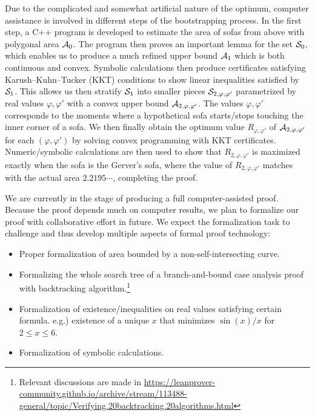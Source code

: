 Due to the complicated and somewhat artificial nature of the optimum, computer assistance is involved in different steps of the bootstrapping process. 
In the first step, a C++ program is developed to estimate the area of sofas from above with polygonal area $\mathcal{A}_0$.
The program then proves an important lemma for the set $\mathcal{S}_0$, which enables us to produce a much refined upper bound $\mathcal{A}_1$ which is both continuous and convex.
Symbolic calculations then produce certificates satisfying Karush–Kuhn–Tucker (KKT) conditions to show linear inequalities satisfied by $\mathcal{S}_1$. 
This allows us then stratify $\mathcal{S}_1$ into smaller pieces $\mathcal{S}_{2, \varphi, \varphi'}$ parametrized by real values $\varphi, \varphi'$ with a convex upper bound $\mathcal{A}_{2, \varphi, \varphi'}$. The values $\varphi, \varphi'$ corresponds to the moments where a hypothetical sofa starts/stops touching the inner corner of a sofa.
We then finally obtain the optimum value $R_{\varphi, \varphi'}$ of $\mathcal{A}_{2, \varphi, \varphi'}$ for each $(\varphi, \varphi')$ by solving convex programming with KKT certificates.
Numeric/symbolic calculations are then used to show that $R_{2, \varphi, \varphi'}$ is maximized exactly when the sofa is the Gerver's sofa, where the value of $R_{2, \varphi, \varphi'}$ matches with the actual area $2.2195\cdots$, completing the proof.

We are currently in the stage of producing a full computer-assisted proof. 
Because the proof depends much on computer results, we plan to formalize our proof with collaborative effort in future. 
We expect the formalization task to challenge and thus develop multiple aspects of formal proof technology:
\begin{itemize}
	\item Proper formalization of area bounded by a non-self-intersecting curve.
	\item Formalizing the whole search tree of a branch-and-bound case analysis proof with backtracking algorithm.\footnote{Relevant discussions are made in \url{https://leanprover-community.github.io/archive/stream/113488-general/topic/Verifying.20backtracking.20algorithms.html} }
	\item Formalization of existence/inequalities on real values satisfying certain formula. e.g.) existence of a unique $x$ that minimizes $\sin(x) / x$ for $2 \leq x \leq 6$.
	\item Formalization of symbolic calculations.
\end{itemize}











